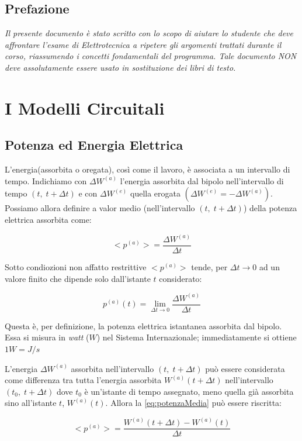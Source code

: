 \documentclass[a4paper]{report}
\begin{document}
\section*{Prefazione}
\emph{Il presente documento \`e stato scritto con lo scopo di aiutare
  lo studente che deve affrontare l'esame di Elettrotecnica a ripetere
  gli argomenti trattati durante il corso, riassumendo i concetti
  fondamentali del programma. Tale documento NON deve assolutamente
  essere usato in sostituzione dei libri di testo.}
\tableofcontents

\chapter{I Modelli Circuitali}
\section{Potenza ed Energia Elettrica}
L'energia(assorbita o oregata), cos\`i come il lavoro, \`e associata a
un intervallo di tempo. Indichiamo con $\Delta W^{(a)}$ l'energia
assorbita dal bipolo nell'intervallo di tempo $(t,\;t+ \Delta t)$ e
con $\Delta W^{(e)}$ quella erogata $(\Delta W^{(e)}=-\Delta
W^{(a)})$. Possiamo allora definire a valor medio (nell'intervallo
$(t,\;t+\Delta t)$) della potenza elettrica assorbita come:

\begin{equation}\label{eq:potenzaMedia}
<p^{(a)}>=\dfrac{\Delta W^{(a)}}{\Delta t}
\end{equation}

Sotto condiozioni non affatto restrittive $<p^{(a)}>$ tende, per
$\Delta t \rightarrow 0$ ad un valore finito che dipende solo
dall'istante $t$ considerato:

\[
p^{(a)}(t)=\lim_{\Delta t \to 0} \frac{\Delta W^{(a)}}{\Delta t}
\]

Questa \`e, per definizione, la potenza elettrica istantanea assorbita
dal bipolo. Essa si misura in \emph{watt} ($W$) nel Sistema
Internazionale; immediatamente si ottiene $1W=J/s$

L'energia $\Delta W^{(a)}$ assorbita nell'intervallo $(t,\; t+\Delta
t)$ pu\`o essere considerata come differenza tra tutta l'energia
assorbita $W^{(a)}(t+\Delta t)$ nell'intervallo $(t_0,\; t+\Delta t)$
dove $t_0$ \`e un'istante di tempo assegnato, meno quella gi\`a
assorbita sino all'istante $t$, $W^{(a)}(t)$. Allora la
\ref{eq:potenzaMedia} pu\`o essere riscritta:

\[
<p^{(a)}>=\dfrac{W^{(a)}(t+\Delta t)-W^{(a)}(t)}{\Delta t}
\]
\end{document}
